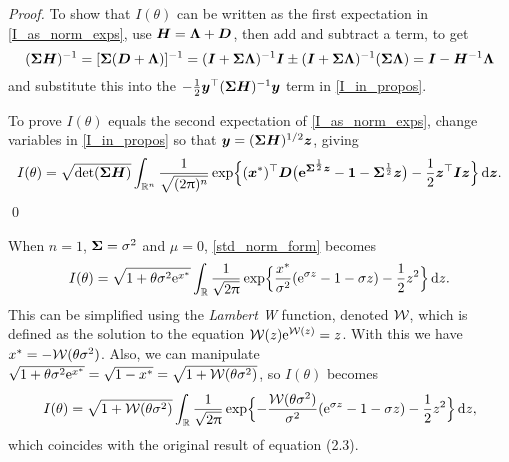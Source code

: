 \begin{proof}
To show that $I(\theta)$ can be written as the first expectation in
\eqref{I_as_norm_exps}, use $\bm{H} = \bm{\Lambda} + \bm{D}$, then add and subtract a term, to get
\[ (\bm{\Sigma} \bm{H})^{-1} = [\bm{\Sigma} (\bm{D} + \bm{\Lambda})]^{-1} = (\bm{I} + \bm{\Sigma} \bm{\Lambda})^{-1} \bm{I}  \pm (\bm{I} + \bm{\Sigma} \bm{\Lambda})^{-1} (\bm{\Sigma} \bm{\Lambda})  = \bm{I} - \bm{H}^{-1} \bm{\Lambda}  \]
and substitute this into the $-\frac12 \bm{y}^\top (\bm{\Sigma} \bm{H})^{-1} \bm{y}$ term in \eqref{I_in_propos}.

To prove $I(\theta)$ equals the second expectation of \eqref{I_as_norm_exps},
change variables in \eqref{I_in_propos} so that $\bm{y} = (\bm{\Sigma} \bm{H})^{1/2} \bm{z}$, giving
\begin{equation} \label{std_norm_form}
	I(\theta) = \sqrt{\det(\bm{\Sigma} \bm{H})}
 \int_{\mathbb{R}^n} \frac{1}{\sqrt{(2\uppi)^n}}
 \exp\Bigl\{ (\bm{x}^*)^\top \bm{D} \bigl( \text{\bf{e}}^{\bm{\Sigma}^{\frac12}\bm{z}} - \bm{1} - \bm{\Sigma}^{\frac12}\bm{z} \bigr) - \frac12 \bm{z}^\top \bm{I} \bm{z} \Bigr\}\mathop{}\!\mathrm{d} \bm{z}.
\end{equation}
\qed
\end{proof}

\begin{remark}\label{R:W} When $n=1$, $\bm{\Sigma} = \sigma^2$ and $\mu=0$,
\eqref{std_norm_form} becomes
\[
	I(\theta) = \sqrt{ 1 + \theta \sigma^2 \mathrm{e}^{x^*}} \int_{\mathbb{R}}
        \frac{1}{\sqrt{2\uppi}} \exp\Bigl\{ \frac{x^*}{\sigma^2} (\mathrm{e}^{\sigma z} - 1 - \sigma z ) - \frac12 z^2 \Bigr\} \mathop{}\!\mathrm{d} z.
\]
This can be simplified using the \emph{Lambert W} function, denoted $\mathcal{W}$,
which is defined \cite{corless1996lambertw} as the solution to the equation $\mathcal{W}(z)
\mathrm{e}^{\mathcal{W}(z)} = z$. With this we have $x^* =
-\mathcal{W}(\theta \sigma^2)$. Also, we can manipulate
$\sqrt{ 1 + \theta \sigma^2 \mathrm{e}^{x^*}}
 =  \sqrt{ 1 - x^* } = \sqrt{ 1 + \mathcal{W}(\theta \sigma^2)}$,
so $I(\theta)$ becomes
\[
	I(\theta) = \sqrt{ 1 + \mathcal{W}(\theta \sigma^2)}
 \int_{\mathbb{R}} \frac{1}{\sqrt{2\uppi}}
 \exp\Bigl\{ {-}\frac{\mathcal{W}(\theta \sigma^2)}{\sigma^2} ( \mathrm{e}^{\sigma z} - 1 - \sigma z ) - \frac12 z^2 \Bigr\} \mathop{}\!\mathrm{d} z,
\]
which coincides with the original result of \cite{asmussen2014laplace}
equation (2.3). \remQED
\end{remark}


